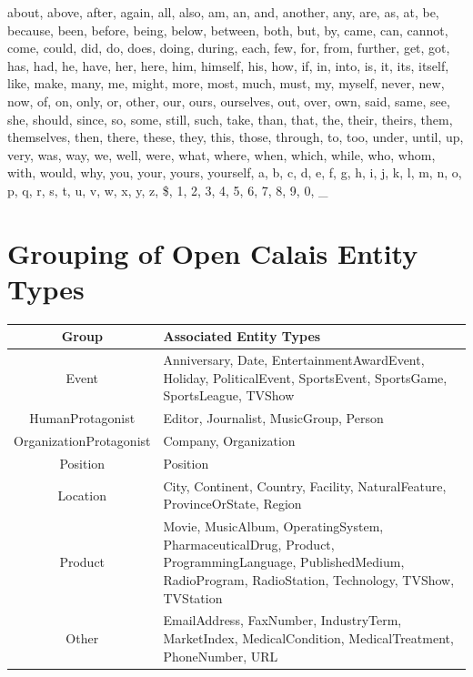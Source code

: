 \documentclass[11pt,a4paper,twoside]{article}
\begin{document}
\begin{appendix}
\noindent about, above, after, again, all, also, am, an, and, another, any, are, as, at, be, because, been, before, being, below, between, both, but, by, came, can, cannot, come, could, did, do, does, doing, during, each, few, for, from, further, get, got, has, had, he, have, her, here, him, himself, his, how, if, in, into, is, it, its, itself, like, make, many, me, might, more, most, much, must, my, myself, never, new, now, of, on, only, or, other, our, ours, ourselves, out, over, own, said, same, see, she, should, since, so, some, still, such, take, than, that, the, their, theirs, them, themselves, then, there, these, they, this, those, through, to, too, under, until, up, very, was, way, we, well, were, what, where, when, which, while, who, whom, with, would, why, you, your, yours, yourself, a, b, c, d, e, f, g, h, i, j, k, l, m, n, o, p, q, r, s, t, u, v, w, x, y, z, \$, 1, 2, 3, 4, 5, 6, 7, 8, 9, 0, \_

\clearpage

\section{Grouping of Open Calais Entity Types} \label{AppendixEntcats}

\begin{table}[h!]
    \centering
    \begin{tabular}{|c|p{10cm}|}
        \hline
        \textbf{Group}          & \textbf{Associated Entity Types} \\
        \hline
        Event                   & \nohyphens{Anniversary, Date, EntertainmentAwardEvent, Holiday, PoliticalEvent, SportsEvent, SportsGame, SportsLeague, TVShow} \\
        \hline
        HumanProtagonist        & Editor, Journalist, MusicGroup, Person \\
        \hline
        OrganizationProtagonist & Company, Organization \\
        \hline
        Position                & Position \\
        \hline
        Location                & \nohyphens{City, Continent, Country, Facility, NaturalFeature, ProvinceOrState, Region} \\
        \hline
        Product                 & \nohyphens{Movie, MusicAlbum, OperatingSystem, PharmaceuticalDrug, Product, ProgrammingLanguage, PublishedMedium, RadioProgram, RadioStation, Technology, TVShow, TVStation} \\
        \hline
        Other                   & \nohyphens{EmailAddress, FaxNumber, IndustryTerm, MarketIndex, MedicalCondition, MedicalTreatment, PhoneNumber, URL} \\
        \hline
    \end{tabular}
    \label{table:entity-groups}
\end{table}

\end{appendix}
\end{document}
